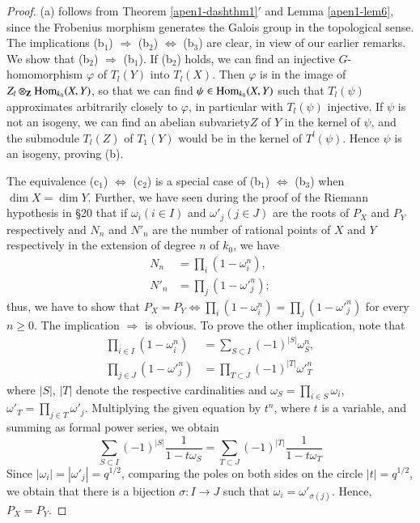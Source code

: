 \begin{proof}
(a) follows from Theorem \ref{apen1-dashthm1}$'$ and Lemma \ref{apen1-lem6}, since the Frobenius morphism generates the Galois group in the topological sense. The implications (b$_1$) $\Rightarrow$ (b$_2$) $\Leftrightarrow$ (b$_3$) are clear, in view of our earlier remarks. We show that (b$_2$) $\Rightarrow$ (b$_1$). If (b$_2$) holds, we can find an injective $G$-homomorphism $\varphi$ of $T_l (Y)$ into $T_l(X)$. Then $\varphi$ is in the image of $Z_l\otimes_{\mathbf{Z}} \operatorname{Hom}_{k_0} (X,Y)$, so that we can find $\psi \in \operatorname{Hom}_{k_0} (X,Y)$ such that $T_l(\psi)$ approximates arbitrarily closely to $\varphi$, in particular with $T_l(\psi)$ injective. If $\psi$ is not an isogeny, we can find an abelian subvariety\pageoriginale $Z$ of $Y$ in the kernel of $\psi$, and the submodule $T_l(Z)$ of $T_1(Y)$ would be in the kernel of $T^l(\psi)$. Hence $\psi$ is an isogeny, proving (b).

The equivalence (c$_1$) $\Leftrightarrow$ (c$_2$) is a special case of (b$_1$) $\Leftrightarrow$ (b$_3$) when $\dim X = \dim Y$. Further, we have seen during the proof of the Riemann hypothesis in \S 20 that if $\omega_i (i \in I)$ and $\omega'_j(j \in J)$ are the roots of $P_X$ and $P_Y$ respectively and $N_n$ and $N'_n$ are the number of rational points of $X$ and $Y$ respectively in the extension of degree $n$ of $k_0$, we have 
\begin{align*}
N_n & = \prod\limits_i (1 - \omega^n_i),\\
N'_n & = \prod\limits_j (1 - \omega'^n_j);
\end{align*}
thus, we have to show that $P_X = P_Y \Leftrightarrow \prod\limits_i (1-\omega^n_i) = \prod\limits_j (1-\omega'^n_j)$ for every $n \geqslant 0$. The implication $\Rightarrow$ is obvious. To prove the other implication, note that 
\begin{align*}
\prod\limits_{i \in I} (1 - \omega^n_i) & = \sum\limits_{S \subset I} (-1)^{|S|} \omega^n_S,\\
\prod\limits_{j \in J} (1 - \omega'^n_j) & = \prod\limits_{T \subset J} (-1)^{|T|} \omega'^n_T
\end{align*}
where $|S|$, $|T|$ denote the respective cardinalities and $\omega_S = \prod\limits_{i \in S} \omega_{i}$, $\omega'_T = \prod\limits_{j \in T} \omega'_j$. Multiplying the given equation by $t^n$, where $t$ is a variable, and summing as formal power series, we obtain
$$
\sum\limits_{S \subset I} (-1)^{|S|} \frac{1}{1-t\omega_S} = \sum\limits_{T \subset J} (-1)^{|T|} \frac{1}{1-t\omega_T}
$$
Since $|\omega_i| = |\omega'_j| = q^{1/2}$, comparing the poles on both sides on the circle $|t|= q^{1/2}$, we obtain that there is a bijection $\sigma: I \to J$ such that $\omega_i = \omega'_{\sigma (j)}$. Hence, $P_X = P_Y$.


\end{proof}
